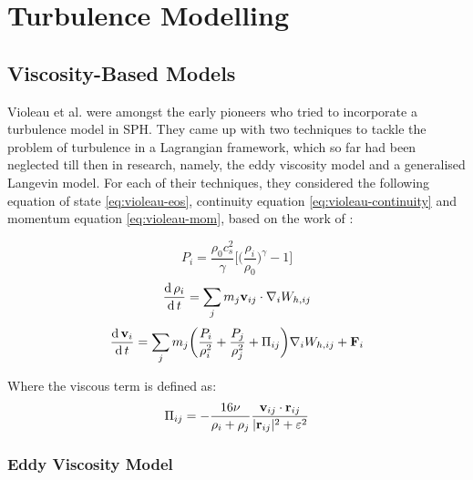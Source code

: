 \chapter{Turbulence Modelling} %
\label{Chapter2}

\section{Viscosity-Based Models}
Violeau et al. \parencite{VIOLEAU2002} were amongst the early pioneers who tried to incorporate a turbulence model in SPH. They came up with two techniques to tackle the problem of turbulence in a Lagrangian framework, which so far had been neglected till then in research, namely, the eddy viscosity model and a generalised Langevin model. For each of their techniques, they considered the following equation of state \ref{eq:violeau-eos}, continuity equation \ref{eq:violeau-continuity} and momentum equation \ref{eq:violeau-mom}, based on the work of \parencite{Monaghan1992}:

\begin{equation}
    P_i = \frac{\rho_0 c_s^2}{\gamma} \Bigg[ \bigg( \frac{\rho_i}{\rho_0} \bigg)^{\gamma} - 1 \Bigg]
    \label{eq:violeau-eos}
\end{equation}
\begin{equation}
    \frac{\operatorname{d} \rho_i}{\operatorname{d} t} = \sum_j m_j \mathbf{v}_{ij} \cdot \nabla_{i} W_{h, ij}
    \label{eq:violeau-continuity}
\end{equation}
\begin{equation}
    \frac{\operatorname{d} \mathbf{v}_i}{\operatorname{d} t} = \sum_j m_j \bigg( \frac{P_i}{\rho_i^2} + \frac{P_j}{\rho_j^2} + \Pi_{ij} \bigg) \nabla_{i} W_{h, ij} + \mathbf{F}_i
    \label{eq:violeau-mom}
\end{equation}

Where the viscous term is defined as:
\begin{equation}
    \Pi_{ij} = - \frac{16\nu}{\rho_i + \rho_j} \frac{\mathbf{v}_{ij} \cdot \mathbf{r}_{ij}}{|\mathbf{r}_{ij}|^{2} + \varepsilon^2} 
    \label{eq:violeau-diffusion-term}
\end{equation}

\subsection{Eddy Viscosity Model}
\label{sec:eddy-visc-model}

